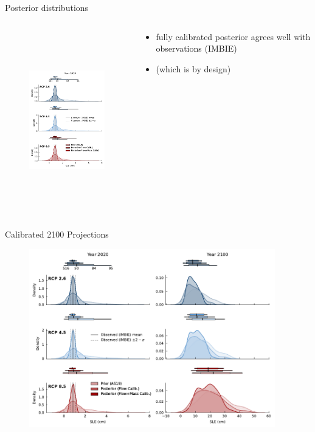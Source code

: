 \documentclass[hide notes,intlimits]{beamer}
\begin{document}
\begin{frame}{Posterior distributions}
  \begin{columns}[c]
    \begin{column}{.5\textwidth}
      \begin{figure}
        \includegraphics[height=7.75cm]{sle_pdf_w_obs_calibrated_2020.pdf}
      \end{figure}
    \end{column}
    \begin{column}{.5\textwidth}
      \begin{itemize}
      \item fully calibrated posterior agrees well with observations (IMBIE)
      \item (which is by design)
      \end{itemize}
    \end{column}
  \end{columns}
\end{frame}


\begin{frame}{Calibrated 2100 Projections}
    \begin{figure}
      \includegraphics[height=7.75cm]{sle_pdf_w_obs_2020_2100}
    \end{figure}
\end{frame}
\end{document}
